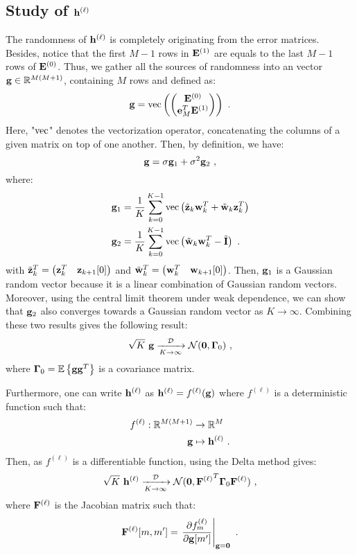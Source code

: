 \documentclass[journal, onecolumn]{IEEEtran}
\begin{document}
\subsection{Study of $\bh^{(\ell)}$}
The randomness of $\bh^{(\ell)}$ is completely originating from the error matrices. Besides, notice that the first $M-1$ rows in $\bE^{(1)}$ are equals to the last $M-1$ rows of $\bE^{(0)}$. Thus, we gather all the sources of randomness into an vector $\bg\in\RR^{M(M+1)}$, containing $M$ rows and defined as:
\[
\bg = \vec\left(
\begin{pmatrix}
\bE^{(0)} \\
\be_M^T\bE^{(1)}
\end{pmatrix}
\right)\ .
\]
Here, "$\vec$" denotes the vectorization operator, concatenating the columns of a given matrix on top of one another. Then, by definition, we have:
\[
\bg = \sigma\bg_1 + \sigma^2\bg_2\ ,
\]
where:
\begin{align*}
\bg_1 &= \dfrac1K\sum_{k=0}^{K-1}\vec\left( \tilde\bz_k\bw_k^T + \tilde\bw_k\bz_k^T \right) \\
\bg_2 &= \dfrac1K\sum_{k=0}^{K-1}\vec\left(\tilde\bw_k\bw_k^T-\tilde\bI \right) \ .
\end{align*}
with $\tilde\bz_k^T= \begin{pmatrix} \bz_k^T & \bz_{k+1}[0] \end{pmatrix}$ and $\tilde\bw_k^T= \begin{pmatrix} \bw_k^T & \bw_{k+1}[0] \end{pmatrix}$. Then, $\bg_1$ is a Gaussian random vector because it is a linear combination of Gaussian random vectors. Moreover, using the central limit theorem under weak dependence, we can show that $\bg_2$ also converges towards a Gaussian random vector as $K\to\infty$. Combining these two results gives the following result:
\[
\sqrt{K}\ \bg \xrightarrow[K\to\infty]{\cD} \cN(\bzero,\bGamma_0)\ ,
\]
where $\bGamma_0=\EE\left\{\bg\bg^T\right\}$ is a covariance matrix.

Furthermore, one can write $\bh^{(\ell)}$ as $\bh^{(\ell)}=f^{(\ell)}(\bg)$ where $f^{(\ell)}$ is a deterministic function such that:
\begin{align*}
f^{(\ell)} : \RR^{M(M+1)} &\to \RR^{M} \\
 \bg &\mapsto \bh^{(\ell)}\ . \\
\end{align*}
Then, as $f^{(\ell)}$ is a differentiable function, using the Delta method gives:
\begin{align*}
\sqrt{K}\ \bh^{(\ell)} \xrightarrow[K\to\infty]{\cD} \cN(\bzero,{\bF^{(\ell)}}^T\bGamma_0\bF^{(\ell)})\ ,
\end{align*}
where $\bF^{(\ell)}$ is the Jacobian matrix such that:
\[
\bF^{(\ell)}[m,m'] = \left.\dfrac{\partial f^{(\ell)}_m}{\partial\bg[m']}\right\vert_{\bg=\bzero}\ .
\]
\end{document}
